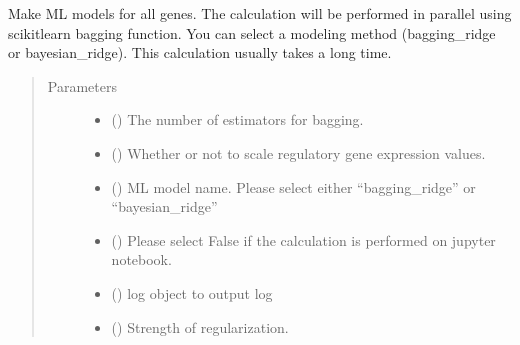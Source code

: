 \documentclass[letterpaper,10pt,english]{sphinxmanual}
\begin{document}
\begin{fulllineitems}
\begin{fulllineitems}
\label{\detokenize{modules/celloracle:celloracle.Net.fit_All_genes}}
Make ML models for all genes.
The calculation will be performed in parallel using scikit\sphinxhyphen{}learn bagging function.
You can select a modeling method (bagging\_ridge or bayesian\_ridge).  This calculation usually takes a long time.
\begin{quote}\begin{description}
\item[{Parameters}] \leavevmode\begin{itemize}
\item {} 
 () \textendash{} The number of estimators for bagging.

\item {} 
 () \textendash{} Whether or not to scale regulatory gene expression values.

\item {} 
 () \textendash{} ML model name. Please select either “bagging\_ridge” or “bayesian\_ridge”

\item {} 
 () \textendash{} Please select False if the calculation is performed on jupyter notebook.

\item {} 
 () \textendash{} log object to output log

\item {} 
 () \textendash{} Strength of regularization.


\end{itemize}
\end{description}
\end{quote}
\end{fulllineitems}
\end{fulllineitems}
\end{document}
